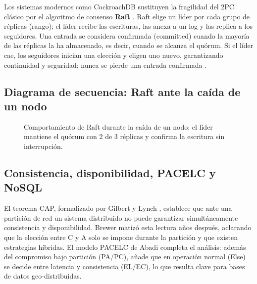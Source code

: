 \documentclass[10pt,a4paper]{article}
\begin{document}
Los sistemas modernos como CockroachDB sustituyen la fragilidad del 2PC clásico por el
algoritmo de consenso \textbf{Raft} \cite{ongaro2014}. Raft elige un líder por cada
grupo de réplicas (rango); el líder recibe las escrituras, las anexa a un log y las
replica a los seguidores. Una entrada se considera confirmada (committed) cuando la
mayoría de las réplicas la ha almacenado, es decir, cuando se alcanza el quórum. Si el
líder cae, los seguidores inician una elección y eligen uno nuevo, garantizando
continuidad y seguridad: nunca se pierde una entrada confirmada \cite{taft2020}.

\subsection{Diagrama de secuencia: Raft ante la caída de un nodo}

\begin{figure}[h]
\centering
{}
\caption{Comportamiento de Raft durante la caída de un nodo: el líder mantiene el quórum con 2 de 3 réplicas y confirma la escritura sin interrupción.}
\label{fig:raft}
\end{figure}

\subsection{Consistencia, disponibilidad, PACELC y NoSQL}
El teorema CAP, formalizado por Gilbert y Lynch \cite{gilbert2002}, establece que ante
una partición de red un sistema distribuido no puede garantizar simultáneamente
consistencia y disponibilidad. Brewer \cite{brewer2012} matizó esta lectura años
después, aclarando que la elección entre C y A solo se impone durante la partición y
que existen estrategias híbridas. El modelo PACELC de Abadi \cite{abadi2012} completa
el análisis: además del compromiso bajo partición (PA/PC), añade que en operación
normal (Else) se decide entre latencia y consistencia (EL/EC), lo que resulta clave
para bases de datos geo-distribuidas.
\end{document}
